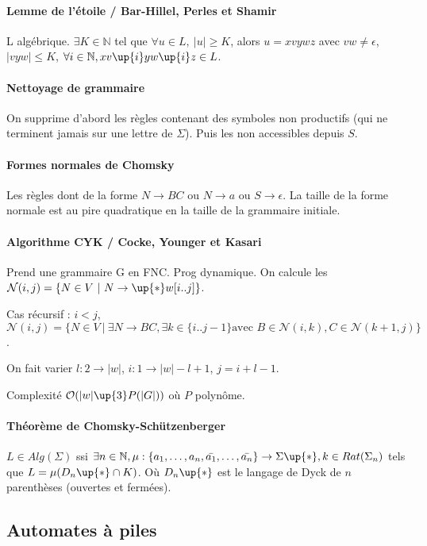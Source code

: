 \documentclass[french]{article}
\begin{document}
\paragraph{Lemme de l'étoile / Bar-Hillel, Perles et Shamir}
L algébrique. $\exists K\in\mathbb{N}$ tel que $\forall u\in L,\ |u|\geq K$, alors $u = xvywz$ avec $vw\neq \epsilon$, $|vyw|\leq K$, $\forall i\in\mathbb{N}, xv\up{i}yw\up{i}z \in L$.

\paragraph{Nettoyage de grammaire}
On supprime d'abord les règles contenant des symboles non productifs (qui ne terminent jamais sur une lettre de $\Sigma$). Puis les non accessibles depuis $S$.

\paragraph{Formes normales de Chomsky}
Les règles dont de la forme $N\rightarrow BC$ ou $N\rightarrow a$ ou $S\rightarrow\epsilon$. La taille de la forme normale est au pire quadratique en la taille de la grammaire initiale.

\paragraph{Algorithme CYK / Cocke,  Younger et Kasari}
Prend une grammaire G en FNC. Prog dynamique. On calcule les $\mathcal{N}(i,j) = \{ N\in V~|~N\rightarrow\up{*}w[i..j]\}$.

Cas récursif : $i<j$, $\mathcal{N}(i,j)=\{N\in V~|~\exists N\rightarrow BC, \exists k\in\{i..j-1\} \text{avec }B\in\mathcal{N}(i,k), C\in\mathcal{N}(k+1, j)\}$.

On fait varier $l\colon2\rightarrow|w|$, $i\colon1\rightarrow|w|-l+1$, $j=i+l-1$.

Complexité $\mathcal{O}(|w|\up{3}P(|G|))$ où $P$ polynôme.

\paragraph{Théorème de Chomsky-Schützenberger}
$L\in Alg(\Sigma)$ ssi $\exists n\in\mathbb{N}, \mu : \{a_1,\dots, a_n, \bar{a_1},\dots, \bar{a_n}\} \rightarrow\Sigma\up{*}, k\in Rat(\Sigma_n)$ tels que $L = \mu(D_n\up{*}\cap K)$. Où $D_n\up{*}$ est le langage de Dyck de $n$ parenthèses (ouvertes et fermées).

\subsection{Automates à piles}
\end{document}
